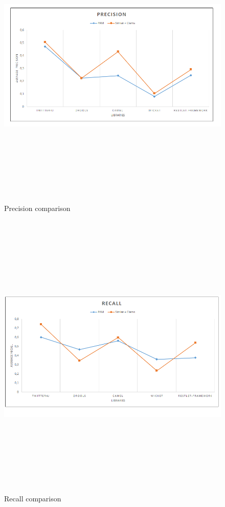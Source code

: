 \begin{figure}[H]
\includegraphics[width=14cm,height=14cm,keepaspectratio]{images/Precision.png}
\centering
  \caption{Precision comparison}
  \label{fig:cmd}
\end{figure}

\begin{figure}[H]
\includegraphics[width=14cm,height=14cm,keepaspectratio]{images/Recall.png}
\centering
\caption{Recall comparison}
\label{fig:cmd}
\end{figure}


